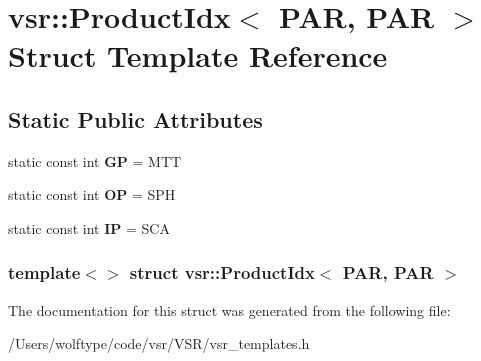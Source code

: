 \hypertarget{structvsr_1_1_product_idx_3_01_p_a_r_00_01_p_a_r_01_4}{\section{vsr\-:\-:Product\-Idx$<$ P\-A\-R, P\-A\-R $>$ Struct Template Reference}
\label{structvsr_1_1_product_idx_3_01_p_a_r_00_01_p_a_r_01_4}
}
\subsection*{Static Public Attributes}
\begin{DoxyCompactItemize}
\item 
\hypertarget{structvsr_1_1_product_idx_3_01_p_a_r_00_01_p_a_r_01_4_acafd58d266559f8f830f86db8005c3c2}{static const int {\bfseries G\-P} = M\-T\-T}\label{structvsr_1_1_product_idx_3_01_p_a_r_00_01_p_a_r_01_4_acafd58d266559f8f830f86db8005c3c2}

\item 
\hypertarget{structvsr_1_1_product_idx_3_01_p_a_r_00_01_p_a_r_01_4_a6f5769b187a086d6ac44d617a6e0535c}{static const int {\bfseries O\-P} = S\-P\-H}\label{structvsr_1_1_product_idx_3_01_p_a_r_00_01_p_a_r_01_4_a6f5769b187a086d6ac44d617a6e0535c}

\item 
\hypertarget{structvsr_1_1_product_idx_3_01_p_a_r_00_01_p_a_r_01_4_a2a8dd150a87570eadc752ca59c8cac7c}{static const int {\bfseries I\-P} = S\-C\-A}\label{structvsr_1_1_product_idx_3_01_p_a_r_00_01_p_a_r_01_4_a2a8dd150a87570eadc752ca59c8cac7c}

\end{DoxyCompactItemize}
\subsubsection*{template$<$$>$ struct vsr\-::\-Product\-Idx$<$ P\-A\-R, P\-A\-R $>$}



The documentation for this struct was generated from the following file\-:\begin{DoxyCompactItemize}
\item 
/\-Users/wolftype/code/vsr/\-V\-S\-R/vsr\-\_\-templates.\-h\end{DoxyCompactItemize}
